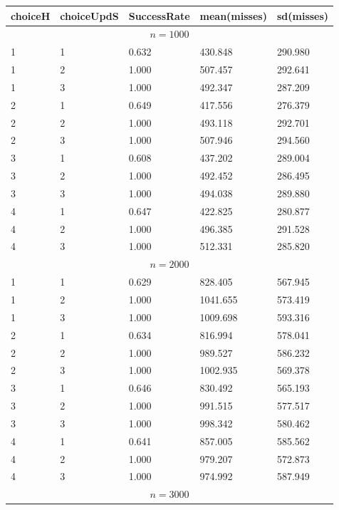\documentclass[11pt,a4paper,draft]{article}
\begin{document}
\begin{description}
	\begin{figure}[!h]
		\centering
		\begin{tabular}{lllll}
			\hline \hline 
			choiceH & choiceUpdS & SuccessRate & mean(misses) & sd(misses) \\
			\hline \hline 
			\multicolumn{5}{c}{$n = 1000$} \\ 
			\hline 
			1 & 1 &  0.632 & 430.848 & 290.980 \\
			1 & 2 &  1.000 & 507.457 & 292.641 \\
			1 & 3 &  1.000 & 492.347 & 287.209 \\
			\hline 
			2 & 1 &  0.649 & 417.556 & 276.379 \\
			2 & 2 &  1.000 & 493.118 & 292.701 \\
			2 & 3 &  1.000 & 507.946 & 294.560 \\
			\hline 
			3 & 1 &  0.608 & 437.202 & 289.004 \\
			3 & 2 &  1.000 & 492.452 & 286.495 \\
			3 & 3 &  1.000 & 494.038 & 289.880 \\
			\hline 
			4 & 1 &  0.647 & 422.825 & 280.877 \\
			4 & 2 &  1.000 & 496.385 & 291.528 \\
			4 & 3 &  1.000 & 512.331 & 285.820 \\
			\hline 
			\hline 
			\multicolumn{5}{c}{$n = 2000$} \\ 
			\hline 
			1 & 1 &  0.629 & 828.405 & 567.945 \\
			1 & 2 &  1.000 & 1041.655 & 573.419 \\
			1 & 3 &  1.000 & 1009.698 & 593.316 \\
			\hline 
			2 & 1 &  0.634 & 816.994 & 578.041 \\
			2 & 2 &  1.000 & 989.527 & 586.232 \\
			2 & 3 &  1.000 & 1002.935 & 569.378 \\
			\hline 
			3 & 1 &  0.646 & 830.492 & 565.193 \\
			3 & 2 &  1.000 & 991.515 & 577.517 \\
			3 & 3 &  1.000 & 998.342 & 580.462 \\
			\hline 
			4 & 1 &  0.641 & 857.005 & 585.562 \\
			4 & 2 &  1.000 & 979.207 & 572.873 \\
			4 & 3 &  1.000 & 974.992 & 587.949 \\
			\hline 
			\hline 
			\multicolumn{5}{c}{$n = 3000$} \\ 
			\hline 

\end{tabular}
\end{figure}
\end{description}
\end{document}
